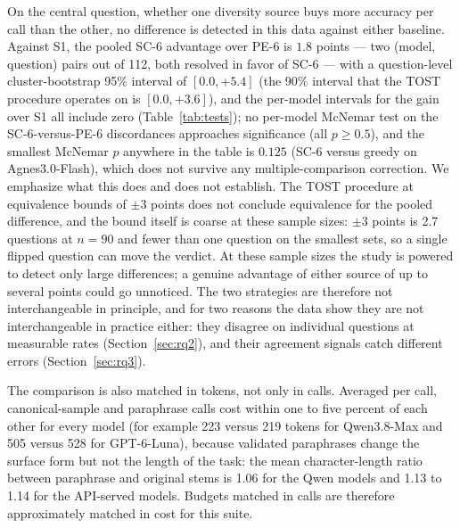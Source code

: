 On the central question, whether one diversity source buys more accuracy per call than the other, no difference is detected in this data against either baseline. Against S1, the pooled SC-6 advantage over PE-6 is $1.8$ points --- two (model, question) pairs out of 112, both resolved in favor of SC-6 --- with a question-level cluster-bootstrap 95\% interval of $[0.0, +5.4]$ (the 90\% interval that the TOST procedure operates on is $[0.0, +3.6]$), and the per-model intervals for the gain over S1 all include zero (Table~\ref{tab:tests}); no per-model McNemar test on the SC-6-versus-PE-6 discordances approaches significance (all $p \ge 0.5$), and the smallest McNemar $p$ anywhere in the table is $0.125$ (SC-6 versus greedy on Agnes3.0-Flash), which does not survive any multiple-comparison correction. We emphasize what this does and does not establish. The TOST procedure at equivalence bounds of $\pm 3$ points does not conclude equivalence for the pooled difference, and the bound itself is coarse at these sample sizes: $\pm 3$ points is 2.7 questions at $n = 90$ and fewer than one question on the smallest sets, so a single flipped question can move the verdict. At these sample sizes the study is powered to detect only large differences; a genuine advantage of either source of up to several points could go unnoticed. The two strategies are therefore not interchangeable in principle, and for two reasons the data show they are not interchangeable in practice either: they disagree on individual questions at measurable rates (Section~\ref{sec:rq2}), and their agreement signals catch different errors (Section~\ref{sec:rq3}).

\begin{table}[htbp]
\centering
\footnotesize
\caption{Paired comparisons between conditions: discordant counts ($b$: first condition right, second wrong; $c$: the reverse), exact McNemar $p$, accuracy difference with 95\% question-resampled bootstrap CI, and the TOST verdict at $\pm 3$ point equivalence bounds. ``no'' means equivalence is not established at this sample size, not that a difference was found.}
\label{tab:tests}

\end{table}

The comparison is also matched in tokens, not only in calls. Averaged per call, canonical-sample and paraphrase calls cost within one to five percent of each other for every model (for example 223 versus 219 tokens for Qwen3.8-Max and 505 versus 528 for GPT-6-Luna), because validated paraphrases change the surface form but not the length of the task: the mean character-length ratio between paraphrase and original stems is 1.06 for the Qwen models and 1.13 to 1.14 for the API-served models. Budgets matched in calls are therefore approximately matched in cost for this suite.

